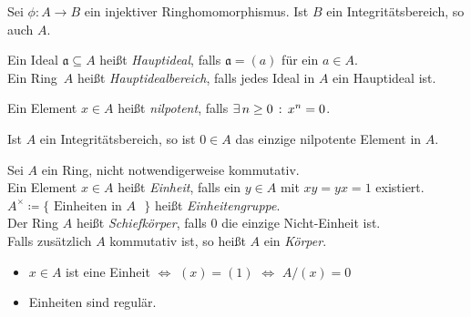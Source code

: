 \documentclass{cheat-sheet}
\newcommand{\aaa}{\mathfrak{a}}
\begin{document}
\begin{beob}
  Sei $\phi : A \to B$ ein injektiver Ringhomomorphismus.
  Ist $B$ ein Integritätsbereich, so auch $A$.
\end{beob}

\begin{defn}
  Ein Ideal $\aaa \subseteq A$ heißt \emph{Hauptideal}, falls $\aaa = (a)$ für ein $a \in A$. \\
  Ein Ring~$A$ heißt \emph{Hauptidealbereich}, falls jedes Ideal in $A$ ein Hauptideal ist.
\end{defn}

\begin{bspe}
  \inlineitem{$\Z$,} \enspace
\end{bspe}

\begin{gegenbsp}
\end{gegenbsp}


\begin{defn}
  Ein Element $x \in A$ heißt \emph{nilpotent}, falls $\exists \, {n \geq 0} \,:\, x^n = 0$.
\end{defn}

\begin{beob}
  Ist $A$ ein Integritätsbereich, so ist $0 \in A$ das einzige nilpotente Element in $A$.
\end{beob}


\begin{defn}
  Sei $A$ ein Ring, nicht notwendigerweise kommutativ. \\
  Ein Element $x \in A$ heißt \emph{Einheit}, falls ein $y \in A$ mit $xy = yx = 1$ existiert.
  $A^\times \coloneqq \{ \text{ Einheiten in $A$ } \}$ heißt \emph{Einheitengruppe}. \\
  Der Ring $A$ heißt \emph{Schiefkörper}, falls $0$ die einzige Nicht-Einheit ist. \\
  Falls zusätzlich $A$ kommutativ ist, so heißt $A$ ein \emph{Körper}.
\end{defn}

\begin{beob}
  \begin{itemize}
    \item $x \in A$ ist eine Einheit $\iff$ $(x) = (1)$ $\iff$ $A/(x) = 0$
    \item Einheiten sind regulär.
  \end{itemize}
\end{beob}
\end{document}

